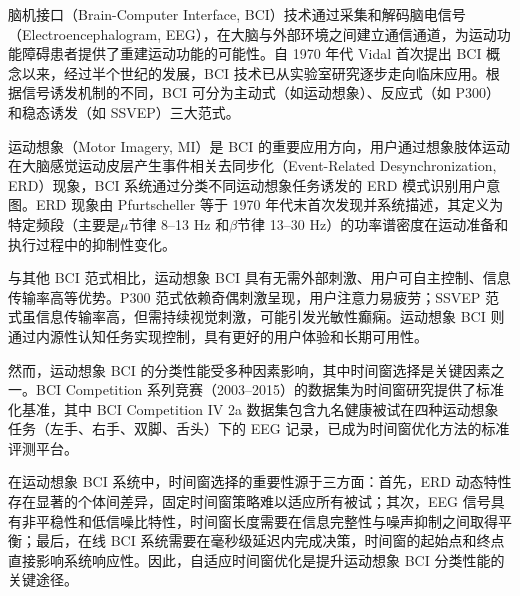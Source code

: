 
\label{chap:introduction}

\label{sec:background}

脑机接口（Brain-Computer Interface, BCI）技术通过采集和解码脑电信号（Electroencephalogram, EEG），在大脑与外部环境之间建立通信通道，为运动功能障碍患者提供了重建运动功能的可能性\cite{tangermann2012review}。自 1970 年代 Vidal 首次提出 BCI 概念以来\cite{vidal1973toward}，经过半个世纪的发展，BCI 技术已从实验室研究逐步走向临床应用。根据信号诱发机制的不同，BCI 可分为主动式（如运动想象）、反应式（如 P300）和稳态诱发（如 SSVEP）三大范式\cite{lotte2018review}。

运动想象（Motor Imagery, MI）是 BCI 的重要应用方向，用户通过想象肢体运动在大脑感觉运动皮层产生事件相关去同步化（Event-Related Desynchronization, ERD）现象，BCI 系统通过分类不同运动想象任务诱发的 ERD 模式识别用户意图\cite{pfurtscheller1999event}。ERD 现象由 Pfurtscheller 等于 1970 年代末首次发现并系统描述，其定义为特定频段（主要是$\mu$节律 8--13 Hz 和$\beta$节律 13--30 Hz）的功率谱密度在运动准备和执行过程中的抑制性变化\cite{pfurtscheller1999event}。

与其他 BCI 范式相比，运动想象 BCI 具有无需外部刺激、用户可自主控制、信息传输率高等优势\cite{lotte2018review}。P300 范式依赖奇偶刺激呈现，用户注意力易疲劳；SSVEP 范式虽信息传输率高，但需持续视觉刺激，可能引发光敏性癫痫。运动想象 BCI 则通过内源性认知任务实现控制，具有更好的用户体验和长期可用性\cite{lotte2018review}。

然而，运动想象 BCI 的分类性能受多种因素影响，其中时间窗选择是关键因素之一\cite{yang2015time}。BCI Competition 系列竞赛（2003--2015）的数据集为时间窗研究提供了标准化基准，其中 BCI Competition IV 2a 数据集包含九名健康被试在四种运动想象任务（左手、右手、双脚、舌头）下的 EEG 记录，已成为时间窗优化方法的标准评测平台\cite{tangermann2012review}。

在运动想象 BCI 系统中，时间窗选择的重要性源于三方面：首先，ERD 动态特性存在显著的个体间差异，固定时间窗策略难以适应所有被试\cite{zhang2019temporally}；其次，EEG 信号具有非平稳性和低信噪比特性，时间窗长度需要在信息完整性与噪声抑制之间取得平衡\cite{blankertz2008optimizing}；最后，在线 BCI 系统需要在毫秒级延迟内完成决策，时间窗的起始点和终点直接影响系统响应性\cite{tangermann2012review}。因此，自适应时间窗优化是提升运动想象 BCI 分类性能的关键途径。

